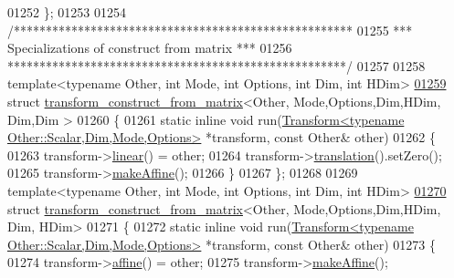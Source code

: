\begin{DoxyCode}
01252 \};
01253 
01254 \textcolor{comment}{/*****************************************************}
01255 \textcolor{comment}{*** Specializations of construct from matrix       ***}
01256 \textcolor{comment}{*****************************************************/}
01257 
01258 \textcolor{keyword}{template}<\textcolor{keyword}{typename} Other, \textcolor{keywordtype}{int} Mode, \textcolor{keywordtype}{int} Options, \textcolor{keywordtype}{int} Dim, \textcolor{keywordtype}{int} HDim>
\hyperlink{struct_eigen_1_1internal_1_1transform__construct__from__matrix_3_01_other_00_01_mode_00_01_optio6dcff4dd79db682c85f7e1f5d15fb563}{01259} \textcolor{keyword}{struct }\hyperlink{struct_eigen_1_1internal_1_1transform__construct__from__matrix}{transform\_construct\_from\_matrix}<Other, Mode,Options,Dim,HDim, Dim,Dim
      >
01260 \{
01261   \textcolor{keyword}{static} \textcolor{keyword}{inline} \textcolor{keywordtype}{void} run(\hyperlink{group___geometry___module_class_eigen_1_1_transform}{Transform<typename Other::Scalar,Dim,Mode,Options>}
       *transform, \textcolor{keyword}{const} Other& other)
01262   \{
01263     transform->\hyperlink{group___geometry___module_a535bd63d047c2a36585c3f9b62219a1e}{linear}() = other;
01264     transform->\hyperlink{group___geometry___module_afa93ba97d26912bb3d8777cbed102045}{translation}().setZero();
01265     transform->\hyperlink{group___geometry___module_a18580c6c151bac89f03818164dd19632}{makeAffine}();
01266   \}
01267 \};
01268 
01269 \textcolor{keyword}{template}<\textcolor{keyword}{typename} Other, \textcolor{keywordtype}{int} Mode, \textcolor{keywordtype}{int} Options, \textcolor{keywordtype}{int} Dim, \textcolor{keywordtype}{int} HDim>
\hyperlink{struct_eigen_1_1internal_1_1transform__construct__from__matrix_3_01_other_00_01_mode_00_01_optio2861b11cb783feb790ab70300c43bf0a}{01270} \textcolor{keyword}{struct }\hyperlink{struct_eigen_1_1internal_1_1transform__construct__from__matrix}{transform\_construct\_from\_matrix}<Other, Mode,Options,Dim,HDim, Dim,
      HDim>
01271 \{
01272   \textcolor{keyword}{static} \textcolor{keyword}{inline} \textcolor{keywordtype}{void} run(\hyperlink{group___geometry___module_class_eigen_1_1_transform}{Transform<typename Other::Scalar,Dim,Mode,Options>}
       *transform, \textcolor{keyword}{const} Other& other)
01273   \{
01274     transform->\hyperlink{group___geometry___module_a88c996ca4cccf46ab4d520b7d99c332b}{affine}() = other;
01275     transform->\hyperlink{group___geometry___module_a18580c6c151bac89f03818164dd19632}{makeAffine}();

\end{DoxyCode}
